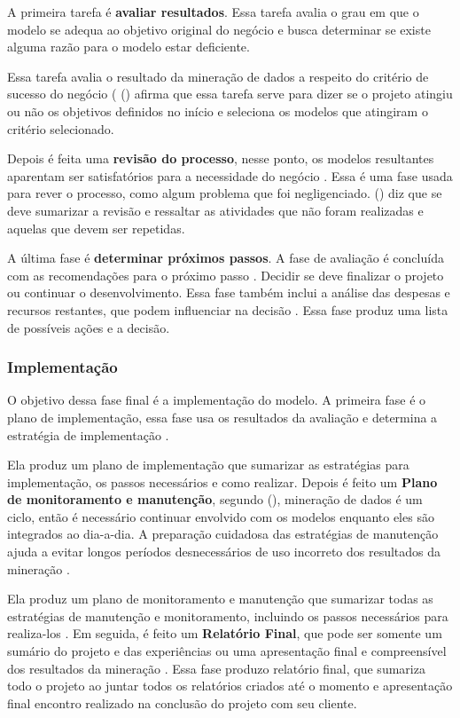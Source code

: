 A primeira tarefa é \textbf{avaliar resultados}. Essa tarefa avalia o grau em que o modelo se adequa ao objetivo original do negócio e busca determinar se existe alguma razão para o modelo estar deficiente.

Essa tarefa avalia o resultado da mineração de dados a respeito do critério de sucesso do negócio (\citeauthor{dmfd} (\citeyear{dmfd}) afirma que essa tarefa serve para dizer se o projeto atingiu ou não os objetivos definidos no início e seleciona os modelos que atingiram o critério selecionado.

Depois é feita uma \textbf{revisão do processo}, nesse ponto, os modelos resultantes aparentam ser satisfatórios para a necessidade do negócio \citep{crispmanual}. Essa é uma fase usada para rever o processo, como algum problema que foi negligenciado. \citeauthor{crispmanual} (\citeyear{crispmanual}) diz que se deve sumarizar a revisão e ressaltar as atividades que não foram realizadas e aquelas que devem ser repetidas.

A última fase é \textbf{determinar próximos passos}. A fase de avaliação é concluída com as recomendações para o próximo passo \citep{dmfd}. Decidir se deve finalizar o projeto ou continuar o desenvolvimento. Essa fase também inclui a análise das despesas  e recursos restantes, que podem influenciar na decisão \citep{crispmanual}.
Essa fase produz uma lista de possíveis ações e a decisão.


\subsubsection{Implementação}
O objetivo dessa fase final é a implementação do modelo.
A primeira fase é o plano de implementação, essa fase usa os resultados da avaliação e determina a estratégia de implementação \citep{crispmanual}. 

Ela produz um plano de implementação que sumarizar as estratégias para implementação, os passos necessários e como realizar.
Depois é feito um \textbf{Plano de monitoramento e manutenção}, segundo \citeauthor{dmfd} (\citeyear{dmfd}), mineração de dados é um ciclo, então é necessário continuar envolvido com os modelos enquanto eles são integrados ao dia-a-dia. A preparação cuidadosa das estratégias de manutenção ajuda a evitar longos períodos desnecessários de uso incorreto dos resultados da mineração \citep{crispmanual}.

Ela produz um plano de monitoramento e manutenção que sumarizar todas as estratégias de manutenção e monitoramento, incluindo os passos necessários para realiza-los \citep{crispmanual}.
Em seguida, é feito um \textbf{Relatório Final}, que pode ser somente um sumário do projeto e das experiências ou uma apresentação final e compreensível dos resultados da mineração \citep{crispmanual}.
Essa fase produzo relatório final, que sumariza todo o projeto ao juntar todos os relatórios criados até o momento \citep{dmfd} e apresentação final encontro realizado na conclusão do projeto com seu cliente.

